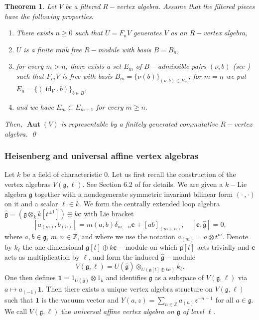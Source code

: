 \documentclass{article}
\newtheorem{thm}{Theorem}[section]
\theoremstyle{definition}
\def\id{\ensuremath{\operatorname{id}}}
\def\BAut{\ensuremath{\operatorname{\mathbf{Aut}}}}
\begin{document}
\begin{thm} \label{filtrep}
	Let $V$ be a filtered $R-$vertex algebra. Assume that the filtered pieces have the following properties.
\begin{enumerate}
    \item There exists $n \geq 0$ such that $U = F_n V$ generates $V$ as an $R-$vertex algebra,
    \item $U$ is a finite rank free $R-$module with basis $B = B_n$,
    \item for every $m > n$, there exists a set $E_m$ of $B-$admissible pairs $(\nu,b)$ (see {\rm \cite{DongGr}}) such that $F_m V$ is free with basis $B_m = \{ \nu(b) \}_{(\nu,b) \in E_m}$; for $m = n$ we put $E_n = \{(\id_V, b)\}_{b \in B}$,
    \item and we have $E_m \subset E_{m+1}$ for every $m \geq n$.
\end{enumerate}
   Then, $\BAut(V)$ is representable by a finitely generated commutative $R-$vertex algebra. \qed
\end{thm}


\subsubsection{Heisenberg and universal affine vertex algebras}\label{Secuniaff}

Let $k$ be a field of characteristic $0.$ Let us first recall the construction of the vertex algebras $V(\mathfrak g, \ell)$. See Section 6.2 of \cite{LL} for details.
   We are given a $k-$Lie algebra $\mathfrak g$ together with a nondegenerate symmetric invariant bilinear form $(\cdot \,, \cdot)$ on it and a scalar $\ell \in k$.
    We form the centrally extended loop algebra $\widehat {\mathfrak g} = (\mathfrak g \otimes_k k[t^{\pm 1}]) \oplus k\mathbf c$ with Lie bracket 
    \[ [a_{(m)}, b_{(n)}] = m (a,b) \delta_{m,-n} \mathbf c + [ab]_{(m+n)}, \quad [\mathbf c, \widehat {\mathfrak g}] = 0,\]
    where $a,b \in \mathfrak g$, $m,n \in \mathbb Z$, and where we use the notation $a_{(m)} = a \otimes t^m$.
    Denote by $k_\ell$ the one-dimensional $\mathfrak g[t] \oplus k \mathbf c-$module on which $\mathfrak g[t]$ acts trivially and $\mathbf c$ acts as multiplication by $\ell$, and form the induced $\widehat{\mathfrak g}-$module 
    \[V(\mathfrak g, \ell) = U(\widehat{\mathfrak g}) \otimes_{U(\mathfrak g[t] \oplus k \mathbf c)} k_\ell.\]
    One then defines $\mathbf 1 = 1_{U(\widehat{\mathfrak g})} \otimes 1_k$ and identifies $\mathfrak g$ as a subspace of $V(\mathfrak g, \ell)$ via $a \mapsto a_{(-1)} \mathbf 1$.
    Then there exists a unique vertex algebra structure on $V(\mathfrak g, \ell)$ such that $\mathbf 1$ is the vacuum vector and $Y(a,z) = \sum_{n \in \mathbb Z} a_{(n)} z^{-n-1}$ for all $a \in \mathfrak g$.
    We call $V(\mathfrak g, \ell)$ the \emph{universal affine vertex algebra on $\mathfrak g$ of level $\ell$}.
    
\end{document}
